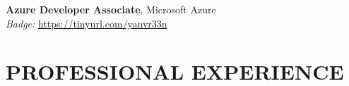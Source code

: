 \documentclass[margin,line]{resume}
\begin{document}
\begin{resume}
    \textbf{\listing Azure Developer Associate}, Microsoft Azure \vspace{1mm}\\
    \textsl{Badge: } \url{https://tinyurl.com/yanvr33n}

    \vspace{-1mm}

\sectionline


\sectionline

    \section{\mysidestyle \textbf{\large{P}\small{ROFESSIONAL} \large{E}\small{XPERIENCE}}}


\end{resume}
\end{document}
